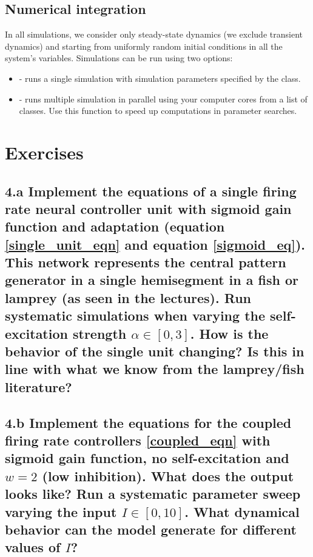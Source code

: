 \documentclass{cmc}
\begin{document}
\subsection*{Numerical integration}
In all simulations, we consider only steady-state dynamics (we exclude transient dynamics) and starting from uniformly random initial conditions in all the system's variables. Simulations can be run using two options:
\begin{itemize}
\item {} - runs a single simulation with simulation parameters specified by the  class.
\item {} - runs multiple simulation in parallel using your computer cores from a list of  classes. Use this function to speed up computations in parameter searches.
\end{itemize}




\section*{Exercises}

\subsection*{4.a Implement the equations of a single firing rate neural controller unit with
 sigmoid gain function and adaptation (equation \ref{single_unit_eqn} and equation \ref{sigmoid_eq}). This network represents the
 central pattern generator in a single hemisegment in a fish or lamprey (as seen in the lectures).
 Run systematic simulations when varying the self-excitation strength $\alpha \in [0,3]$. How is the behavior of the single unit changing? Is this in line with what we know from the lamprey/fish literature?}


\subsection*{4.b Implement the equations for the coupled firing rate controllers \ref{coupled_eqn} with sigmoid
 gain function, no self-excitation and $w=2$ (low inhibition). What does the output looks
 like? Run a systematic parameter sweep varying the input $I \in [0,10]$. What dynamical behavior can the model generate
 for different values of $I$?
}
\end{document}
